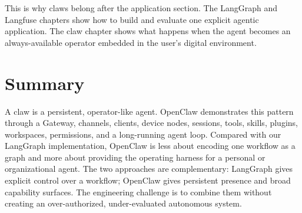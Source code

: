 This is why claws belong after the application section. The LangGraph and Langfuse chapters show how to build and evaluate one explicit agentic application. The claw chapter shows what happens when the agent becomes an always-available operator embedded in the user's digital environment.

\section{Summary}

A claw is a persistent, operator-like agent. OpenClaw demonstrates this pattern through a Gateway, channels, clients, device nodes, sessions, tools, skills, plugins, workspaces, permissions, and a long-running agent loop. Compared with our LangGraph implementation, OpenClaw is less about encoding one workflow as a graph and more about providing the operating harness for a personal or organizational agent. The two approaches are complementary: LangGraph gives explicit control over a workflow; OpenClaw gives persistent presence and broad capability surfaces. The engineering challenge is to combine them without creating an over-authorized, under-evaluated autonomous system.

